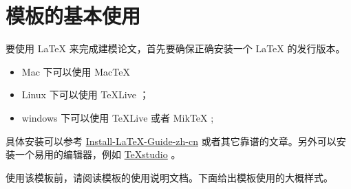 \documentclass[withoutpreface,bwprint]{cumcmthesis}
\begin{document}
\tableofcontents
\newpage

\pagestyle{mainmatterstyle}
\setcounter{page}{1}
\section{模板的基本使用}

要使用 \LaTeX{} 来完成建模论文，首先要确保正确安装一个 \LaTeX{} 的发行版本。

\begin{itemize}
    \item Mac 下可以使用 Mac\TeX{}
    \item Linux 下可以使用 \TeX{}Live ；
    \item windows 下可以使用 \TeX{}Live 或者 Mik\TeX{} ;
\end{itemize}

具体安装可以参考 \href{https://github.com/OsbertWang/install-latex-guide-zh-cn/releases/}{Install-LaTeX-Guide-zh-cn} 或者其它靠谱的文章。另外可以安装一个易用的编辑器，例如 \href{https://mirrors.tuna.tsinghua.edu.cn/github-release/texstudio-org/texstudio/LatestRelease/}{\TeX{}studio} 。

使用该模板前，请阅读模板的使用说明文档。下面给出模板使用的大概样式。
\end{document}

